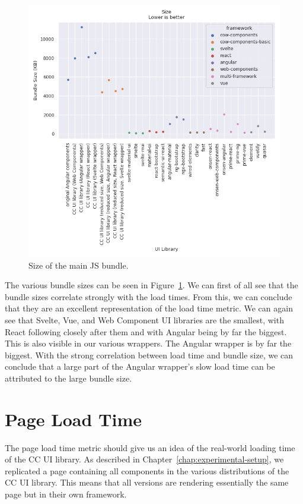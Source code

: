 \begin{figure}[h]
  \includegraphics[width=\columnwidth]{plots/size.png}
  \caption{Size of the main JS bundle.}
  \label{fig:results:size}
  \centering
\end{figure}


The various bundle sizes can be seen in Figure~\ref{fig:results:size}. We can first of all see that the bundle sizes correlate strongly with the load times. From this, we can conclude that they are an excellent representation of the load time metric. We can again see that Svelte, Vue, and Web Component UI libraries are the smallest, with React following closely after them and with Angular being by far the biggest. This is also visible in our various wrappers. The Angular wrapper is by far the biggest. With the strong correlation between load time and bundle size, we can conclude that a large part of the Angular wrapper's slow load time can be attributed to the large bundle size.

\section{Page Load Time}
The page load time metric should give us an idea of the real-world loading time of the CC UI library. As described in Chapter~\ref{chap:experimental-setup}, we replicated a page containing all components in the various distributions of the CC UI library. This means that all versions are rendering essentially the same page but in their own framework.

